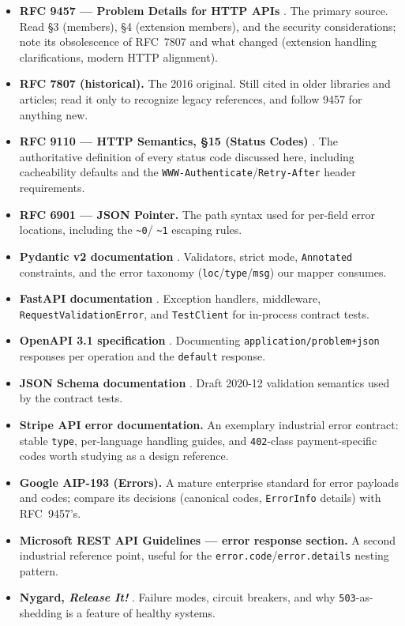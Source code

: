 \begin{itemize}
  \item \textbf{RFC 9457 --- Problem Details for HTTP APIs} \cite{rfc9457}.
        The primary source. Read \S3 (members), \S4 (extension members), and
        the security considerations; note its obsolescence of RFC~7807 and
        what changed (extension handling clarifications, modern HTTP
        alignment).
  \item \textbf{RFC 7807 (historical).} The 2016 original. Still cited in
        older libraries and articles; read it only to recognize legacy
        references, and follow 9457 for anything new.
  \item \textbf{RFC 9110 --- HTTP Semantics, \S15 (Status Codes)}
        \cite{rfc9110}. The authoritative definition of every status code
        discussed here, including cacheability defaults and the
        \texttt{WWW-Authenticate}/\texttt{Retry-After} header requirements.
  \item \textbf{RFC 6901 --- JSON Pointer.} The path syntax used for
        per-field error locations, including the \texttt{\textasciitilde 0}/
        \texttt{\textasciitilde 1} escaping rules.
  \item \textbf{Pydantic v2 documentation} \cite{pydanticdocs}. Validators,
        strict mode, \texttt{Annotated} constraints, and the error taxonomy
        (\texttt{loc}/\texttt{type}/\texttt{msg}) our mapper consumes.
  \item \textbf{FastAPI documentation} \cite{fastapidocs}. Exception
        handlers, middleware, \texttt{RequestValidationError}, and
        \texttt{TestClient} for in-process contract tests.
  \item \textbf{OpenAPI 3.1 specification} \cite{openapi31}. Documenting
        \texttt{application/problem+json} responses per operation and the
        \texttt{default} response.
  \item \textbf{JSON Schema documentation} \cite{jsonschemadocs}. Draft
        2020-12 validation semantics used by the contract tests.
  \item \textbf{Stripe API error documentation.} An exemplary industrial
        error contract: stable \texttt{type}, per-language handling guides,
        and \texttt{402}-class payment-specific codes worth studying as a
        design reference.
  \item \textbf{Google AIP-193 (Errors).} A mature enterprise standard for
        error payloads and codes; compare its decisions (canonical codes,
        \texttt{ErrorInfo} details) with RFC~9457's.
  \item \textbf{Microsoft REST API Guidelines --- error response section.}
        A second industrial reference point, useful for the
        \texttt{error.code}/\texttt{error.details} nesting pattern.
  \item \textbf{Nygard, \emph{Release It!}} \cite{nygard2018releaseit}.
        Failure modes, circuit breakers, and why \texttt{503}-as-shedding is
        a feature of healthy systems.
\end{itemize}

